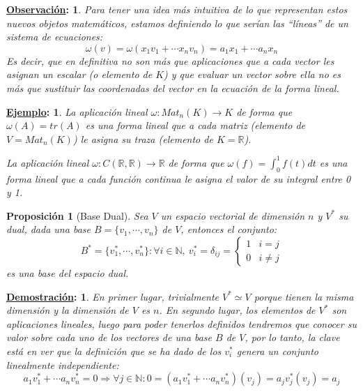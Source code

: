 \documentclass[10pt,a4paper,openright]{book}
\theoremstyle{break}
\newtheorem*{prop}{Proposición}
\newtheorem*{demo}{\underline{Demostración}:}
\newtheorem*{obs}{\underline{Observación}:}
\newtheorem*{ej}{\underline{Ejemplo}:}
\begin{document}
\begin{obs}
Para tener una idea más intuitiva de lo que representan estos nuevos objetos matemáticos, estamos definiendo lo que serían las ``líneas'' de un sistema de ecuaciones:
$$\omega(v)=\omega(x_1v_1+\cdots x_nv_n)=a_1x_1+\cdots a_nx_n$$
Es decir, que en definitiva no son más que aplicaciones que a cada vector les asignan un escalar (o elemento de $K$) y que evaluar un vector sobre ella no es más que sustituir las coordenadas del vector en la ecuación de la forma lineal.
\end{obs}

\begin{ej}
La aplicación lineal $\omega: Mat_n(K)\rightarrow K$ de forma que $\omega(A)=tr(A)$ es una forma lineal que a cada matriz (elemento de $V = Mat_n(K)$) le asigna su traza (elemento de $K=\mathbb{R}$).

La aplicación lineal $\omega: C(\mathbb R, \mathbb R)\rightarrow \mathbb R$ de forma que $\omega(f)=\int_0^1 f(t)dt$ es una forma lineal que a cada función continua le asigna el valor de su integral entre 0 y 1.
\end{ej}

\begin{prop}[Base Dual]
Sea $V$ un espacio vectorial de dimensión $n$ y $V^*$ su dual, dada una base $B=\{v_1,\cdots, v_n\}$ de $V$, entonces el conjunto:
$$B^*=\{v_1^*, \cdots, v_n^*\} : \forall i \in \mathbb{N}, \ v_i^* = \delta_{ij} =  \begin{cases} 1 & i =j \\ 0 & i \neq j \end{cases}$$
es una base del espacio dual.
\end{prop}
\begin{demo}
En primer lugar, trivialmente $V^*\simeq V$ porque tienen la misma dimensión y la dimensión de $V$ es $n$. En segundo lugar, los elementos de $V^*$ son aplicaciones lineales, luego para poder tenerlos definidos tendremos que conocer su valor sobre cada uno de los vectores de una base $B$ de $V$, por lo tanto, la clave está en ver que la definición que se ha dado de los $v_i^*$ genera un conjunto linealmente independiente:
$$a_1v_1^* +\cdots a_nv_n^*=0\Rightarrow \forall j\in \mathbb N : 0=(a_1v_1^*+\cdots a_nv_n^*)(v_j)= a_jv_j^*(v_j)=a_j$$
\end{demo}
\end{document}
